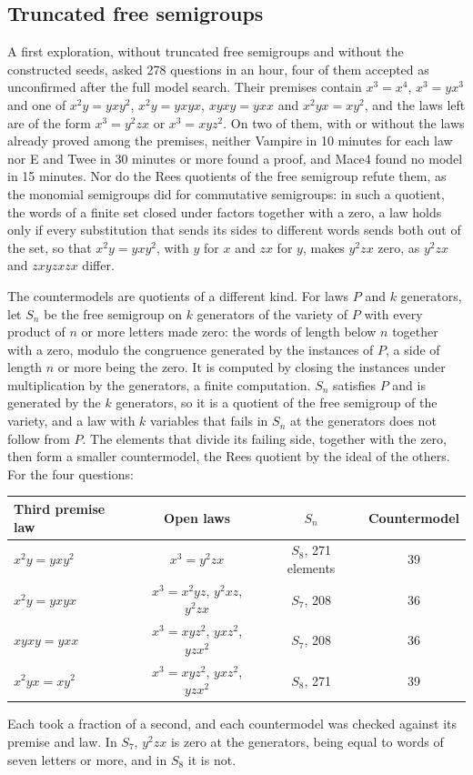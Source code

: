 \documentclass[11pt,a4paper]{article}
\theoremstyle{definition}
\theoremstyle{remark}
\begin{document}
\subsection{Truncated free semigroups}\label{sec:truncated}

A first exploration, without truncated free semigroups and without the constructed seeds, asked 278 questions in an hour, four of them accepted as unconfirmed after the full model search. Their premises contain $x^3 = x^4$, $x^3 = yx^3$ and one of $x^2y = yxy^2$, $x^2y = yxyx$, $xyxy = yxx$ and $x^2yx = xy^2$, and the laws left are of the form $x^3 = y^2zx$ or $x^3 = xyz^2$. On two of them, with or without the laws already proved among the premises, neither Vampire in 10 minutes for each law nor E and Twee in 30 minutes or more found a proof, and Mace4 found no model in 15 minutes. Nor do the Rees quotients of the free semigroup refute them, as the monomial semigroups did for commutative semigroups: in such a quotient, the words of a finite set closed under factors together with a zero, a law holds only if every substitution that sends its sides to different words sends both out of the set, so that $x^2y = yxy^2$, with $y$ for $x$ and $zx$ for $y$, makes $y^2zx$ zero, as $y^2zx$ and $zxyzxzx$ differ.

The countermodels are quotients of a different kind. For laws $P$ and $k$ generators, let $S_n$ be the free semigroup on $k$ generators of the variety of $P$ with every product of $n$ or more letters made zero: the words of length below $n$ together with a zero, modulo the congruence generated by the instances of $P$, a side of length $n$ or more being the zero. It is computed by closing the instances under multiplication by the generators, a finite computation. $S_n$ satisfies $P$ and is generated by the $k$ generators, so it is a quotient of the free semigroup of the variety, and a law with $k$ variables that fails in $S_n$ at the generators does not follow from $P$. The elements that divide its failing side, together with the zero, then form a smaller countermodel, the Rees quotient by the ideal of the others. For the four questions:
\begin{center}
\small
\begin{tabular}{@{}lccc@{}}
\toprule
Third premise law & Open laws & $S_n$ & Countermodel \\
\midrule
$x^2y = yxy^2$ & $x^3 = y^2zx$ & $S_8$, 271 elements & 39 \\
$x^2y = yxyx$ & $x^3 = x^2yz$, $y^2xz$, $y^2zx$ & $S_7$, 208 & 36 \\
$xyxy = yxx$ & $x^3 = xyz^2$, $yxz^2$, $yzx^2$ & $S_7$, 208 & 36 \\
$x^2yx = xy^2$ & $x^3 = xyz^2$, $yxz^2$, $yzx^2$ & $S_8$, 271 & 39 \\
\bottomrule
\end{tabular}
\end{center}
Each took a fraction of a second, and each countermodel was checked against its premise and law. In $S_7$, $y^2zx$ is zero at the generators, being equal to words of seven letters or more, and in $S_8$ it is not.
\end{document}
